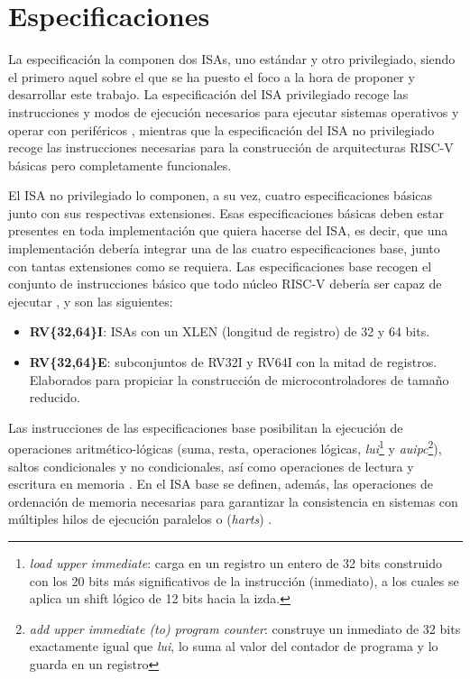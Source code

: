 \section{Especificaciones}

La especificación la componen dos ISAs, uno estándar y otro privilegiado, siendo el primero aquel sobre el que se ha puesto el foco a la hora de proponer y desarrollar este trabajo. La especificación del ISA privilegiado recoge las instrucciones y modos de ejecución necesarios para ejecutar sistemas operativos y operar con periféricos \cite{riscv-unpriv-isa-20250508-priv-isa-brief}, mientras que la especificación del ISA no privilegiado recoge las instrucciones necesarias para la construcción de arquitecturas RISC-V básicas pero completamente funcionales.

El ISA no privilegiado lo componen, a su vez, cuatro especificaciones básicas junto con sus respectivas extensiones. Esas especificaciones básicas deben estar presentes en toda implementación que quiera hacerse del ISA, es decir, que una implementación debería integrar una de las cuatro especificaciones base, junto con tantas extensiones como se requiera. Las especificaciones base recogen el conjunto de instrucciones básico que todo núcleo RISC-V debería ser capaz de ejecutar  \cite{riscv-unpriv-isa-20250508-unpriv-isa-brief}, y son las siguientes:

\begin{itemize}
  \item \textbf{RV\{32,64\}I}: ISAs con un XLEN (longitud de registro) de 32 y 64 bits.
  \vspace{-0.2cm}
  \item \textbf{RV\{32,64\}E}: subconjuntos de RV32I y RV64I con la mitad de registros. Elaborados para propiciar la construcción de microcontroladores de tamaño reducido.
\end{itemize}

Las instrucciones de las especificaciones base posibilitan la ejecución de operaciones aritmético-lógicas (suma, resta, operaciones lógicas, \textit{lui}\footnote{\textit{load upper immediate}: carga en un registro un entero de 32 bits construido con los 20 bits más significativos de la instrucción (inmediato), a los cuales se aplica un shift lógico de 12 bits hacia la izda.} y \textit{auipc}\footnote{\textit{add upper immediate (to) program counter}: construye un inmediato de 32 bits exactamente igual que \textit{lui}, lo suma al valor del contador de programa y lo guarda en un registro}), saltos condicionales y no condicionales, así como operaciones de lectura y escritura en memoria \cite{riscv-unpriv-isa-20250508-unpriv-isa-arit-instr}. En el ISA base se definen, además, las operaciones de ordenación de memoria necesarias para garantizar la consistencia en sistemas con múltiples hilos de ejecución paralelos o (\textit{harts}) \cite{riscv-unpriv-isa-20250508-unpriv-isa-mem-order}.

